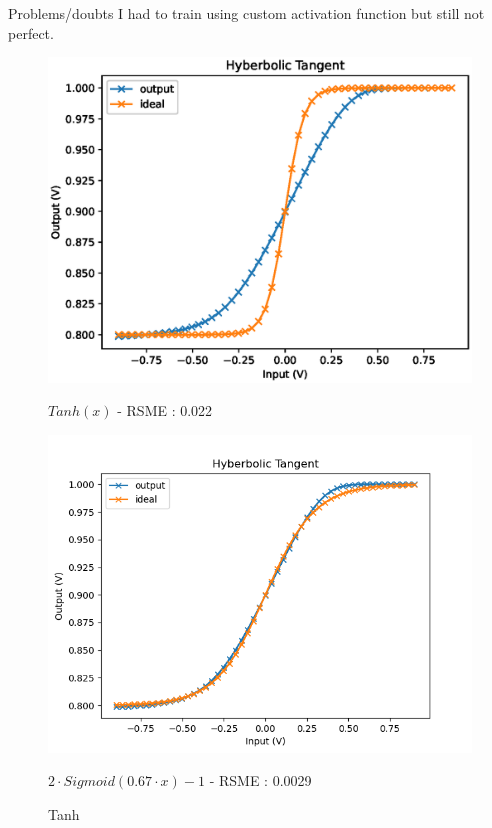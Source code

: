 \documentclass[table]{beamer}
\begin{document}
\begin{frame}{Problems/doubts}
  I had to train using custom activation function but still not perfect.
  \begin{figure}[!tbp]
    \centering
    \begin{minipage}[b]{0.4\textwidth}
      \centering
      \includegraphics[width=\textwidth]{activation/tanh}
      \caption{ $ Tanh(x) $ - RSME : 0.022}
    \end{minipage}
    \hspace{20pt}
    \begin{minipage}[b]{0.4\textwidth}
      \centering
      \includegraphics[width=\textwidth]{activation/cTanh}
      \caption{ $2\cdot Sigmoid(0.67\cdot x)-1$ - RSME : 0.0029}
    \end{minipage}
    \caption{Tanh}
  \end{figure}
\end{frame}
\end{document}
